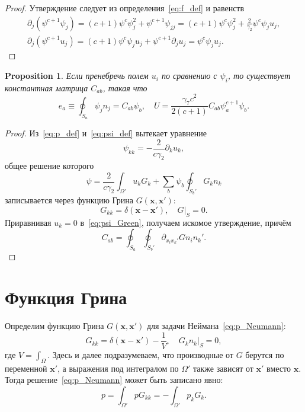 \documentclass{article}
\newtheorem{proposition}{Proposition}
\newcommand{\bx}{\boldsymbol{x}}
\begin{document}
\begin{proof}
Утверждение следует из определения~\eqref{eq:f_def} и равенств
\begin{gather*}
    \partial_j\left( \psi^{c+1} \psi_j \right) = (c+1)\psi^c\psi_j^2 + \psi^{c+1}\psi_{jj} =
        (c+1)\psi^c\psi_j^2 + \frac2{\gamma_2}\psi^c\psi_j u_j, \\
    \partial_j\left( \psi^{c+1} u_j \right) = (c+1)\psi^c\psi_j u_j + \psi^{c+1}\partial_j u_j =
        \psi^c \psi_j u_j.
\end{gather*}
\end{proof}

\begin{proposition}\label{prop:capacity}
Если пренебречь полем \(u_i\) по сравнению с \(\psi_i\), то существует константная матрица \(C_{ab}\), такая что
\begin{equation}\label{eq:capacity}
    e_a\equiv\oint_{S_a} \psi_j n_j = C_{ab}\psi_b, \quad
    U = \frac{\gamma_7c^2}{2(c+1)} C_{ab} \psi_a^{c+1}\psi_b.
\end{equation}
\end{proposition}

\begin{proof}
Из~\eqref{eq:p_def} и~\eqref{eq:psi_def} вытекает уравнение
\[ \psi_{kk} = -\frac2{c\gamma_2}\partial_k u_k, \]
общее решение которого
\begin{equation}\label{eq:psi_Green}
    \psi = \frac2{c\gamma_2} \int_{\Omega'} u_k G_k + \sum_b \psi_b \oint_{S_b'} G_k n_k
\end{equation}
записывается через функцию Грина \(G(\bx, \bx')\):
\begin{equation}\label{eq:Green_function_psi}
    G_{kk} = \delta(\bx-\bx'), \quad G|_S = 0.
\end{equation}
Приравнивая \(u_k=0\) в~\eqref{eq:psi_Green}, получаем искомое утверждение, причём
\[ C_{ab} = \oint_{S_a}\oint_{S_b'} \partial_{x_i x_k'} G n_i n_k'. \]
\end{proof}


\section{Функция Грина}

Определим функцию Грина \(G(\bx, \bx')\) для задачи Неймана~\eqref{eq:p_Neumann}:
\begin{equation}\label{eq:Green_function_p}
    G_{kk} = \delta(\bx-\bx') - \frac1V, \quad \left. G_k n_k \right|_S = 0,
\end{equation}
где \(V = \int_\Omega\). Здесь и далее подразумеваем, что производные от \(G\)
берутся по переменной \(\bx'\), а выражения под интегралом по \(\Omega'\) также
зависят от \(\bx'\) вместо \(\bx\).
Тогда решение~\eqref{eq:p_Neumann} может быть записано явно:
\begin{equation}\label{eq:pressure_solution}
    p = \int_{\Omega'} p G_{kk} = -\int_{\Omega'} p_k G_k.
\end{equation}
\end{document}
